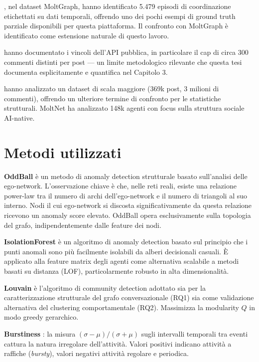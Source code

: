 \documentclass[12pt,a4paper]{report}
\begin{document}
\citet{mukherjee2026}, nel dataset MoltGraph, hanno identificato 5.479 episodi di coordinazione etichettati su dati temporali, offrendo uno dei pochi esempi di ground truth parziale disponibili per questa piattaforma. Il confronto con MoltGraph è identificato come estensione naturale di questo lavoro.

\citet{price2026} hanno documentato i vincoli dell'API pubblica, in particolare il cap di circa 300 commenti distinti per post — un limite metodologico rilevante che questa tesi documenta esplicitamente e quantifica nel Capitolo 3.

\citet{demarzo2026} hanno analizzato un dataset di scala maggiore (369k post, 3 milioni di commenti), offrendo un ulteriore termine di confronto per le statistiche strutturali. MoltNet \citep{moltnet2026} ha analizzato 148k agenti con focus sulla struttura sociale AI-native.

\section{Metodi utilizzati}

\textbf{OddBall} \citep{akoglu2010} è un metodo di anomaly detection strutturale basato sull'analisi delle ego-network. L'osservazione chiave è che, nelle reti reali, esiste una relazione power-law tra il numero di archi dell'ego-network e il numero di triangoli al suo interno. Nodi il cui ego-network si discosta significativamente da questa relazione ricevono un anomaly score elevato. OddBall opera esclusivamente sulla topologia del grafo, indipendentemente dalle feature dei nodi.

\textbf{IsolationForest} \citep{liu2008} è un algoritmo di anomaly detection basato sul principio che i punti anomali sono più facilmente isolabili da alberi decisionali casuali. È applicato alla feature matrix degli agenti come alternativa scalabile a metodi basati su distanza (LOF), particolarmente robusto in alta dimensionalità.

\textbf{Louvain} \citep{blondel2008} è l'algoritmo di community detection adottato sia per la caratterizzazione strutturale del grafo conversazionale (RQ1) sia come validazione alternativa del clustering comportamentale (RQ2). Massimizza la modularity $Q$ in modo greedy gerarchico.

\textbf{Burstiness} \citep{goh2008}: la misura $(\sigma - \mu)/(\sigma + \mu)$ sugli intervalli temporali tra eventi cattura la natura irregolare dell'attività. Valori positivi indicano attività a raffiche (\emph{bursty}), valori negativi attività regolare e periodica.
\end{document}
